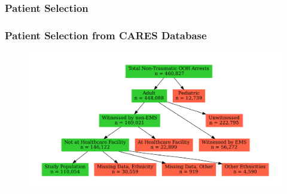 \documentclass{beamer}
\begin{document}
		\subsubsection*{Patient Selection}
			\begin{frame}
				\frametitle{Patient Selection from CARES Database}
				\begin{figure}
					\centering
					\includegraphics[width=1\linewidth]{fig_cpr-outcomes}
					\label{fig:figcpr-outcomes}
				\end{figure}
			\end{frame}
\end{document}
